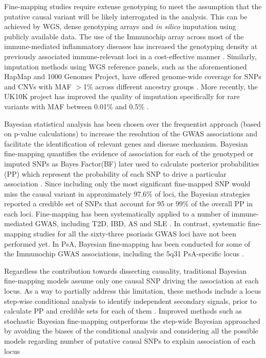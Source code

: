 Fine-mapping studies require extense genotyping to meet the assumption that the putative causal variant will be likely interrogated in the analysis. This can be achieved by WGS, dense genotyping arrays and \textit{in silico} imputation using publicly available data. The use of the Immunochip array across most of the immune-mediated inflammatory diseases has increased the genotyping density at previously associated immune-relevant loci in a cost-effective manner \parencite{Trynka2011}. Similarly, imputation methods using WGS reference panels, such as the aforementioned HapMap and 1000 Genomes Project, have offered genome-wide coverage for SNPs and CNVs with MAF $>$1\% across different ancestry groups \parencite{Abecasis2012}. More recently, the UK10K project has improved the quality of imputation specifically for rare variants with MAF between 0.01\% and 0.5\% \parencite{Chou2016}. 

Bayesian statistical analysis has been chosen over the frequentist approach (based on p-value calculations) to increase the resolution of the GWAS associations and facilitate the identification of relevant genes and disease mechanism. Bayesian fine-mapping quantifies the evidence of association for each of the genotyped or imputed SNPs as Bayes Factor(BF) later used to calculate posterior probabilities (PP) which represent the probability of each SNP to drive a particular association \parencite{Wakefield2007}. Since including only the most significant fine-mapped SNP would miss the causal variant in approximately 97.6\% of loci, the Bayesian strategies reported a credible set of SNPs that account for 95 or 99\% of the overall PP in each loci\parencite{Bunt2015}. Fine-mapping has been systematically applied to a number of immune-mediated GWAS, including T2D, IBD, AS and SLE \parencite{Maller2012,Gaulton2015,Bunt2015,Sun2016,Huang2017}. In contrast, systematic fine-mapping studies for all the sixty-three psoriasis GWAS loci have not been performed yet. In PsA, Bayesian fine-mapping has been conducted for some of the Immunochip GWAS associations, including the 5q31 PsA-specific locus  \parencite{Bowes2015}. 

Regardless the contribution towards dissecting causality, traditional Bayesian fine-mapping models assume only one causal SNP driving the association at each locus. As a way to partially address this limitation, these methods include a locus step-wise conditional analysis to identify independent secondary signals, prior to calculate PP and credible sets for each of them . Improved methods such as stochastic Bayesian fine-mapping outperforms the step-wide Bayesian approached by avoiding the biases of the conditional analysis and considering all the possible models regarding number of putative causal SNPs to explain association of each locus \parencite{Wallace2016}

